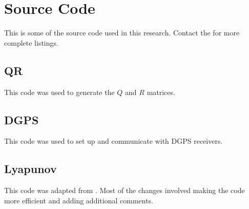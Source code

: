 \chapter{Source Code}
\label{ch:code}
This is some of the source code used in this research. Contact the  for more complete listings.

\section{QR}
\label{sec:qrcode}
This code was used to generate the $Q$ and $R$ matrices.
\lstset{language=C++}

\clearpage
\section{DGPS}
\label{sec:dgpscode}
This code was used to set up and communicate with DGPS receivers.

\clearpage
\section{Lyapunov}
\label{sec:lyapunovcode}
This code was adapted from \cite{Rusu05RobotuxLyapunov}. Most of the changes involved making the code more efficient and adding additional comments.
\lstset{language=Matlab}
